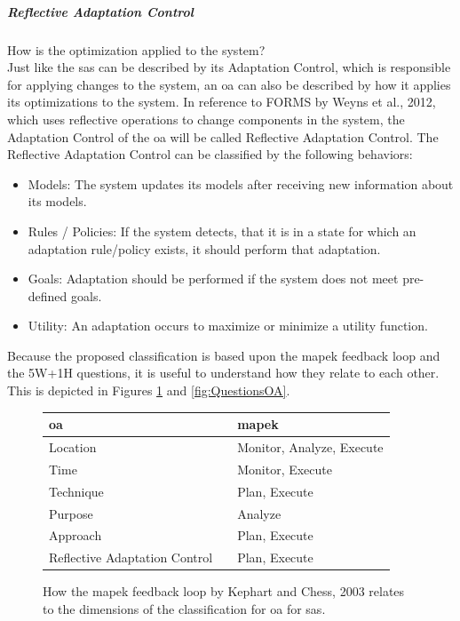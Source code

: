 \subparagraph*{Reflective Adaptation Control}
How is the optimization applied to the system? \\
Just like the \acrshort{sas} can be described by its Adaptation Control,
which is responsible for applying changes to the system,
an \acrshort{oa} can also be described by how it applies its optimizations to the system.
In reference to FORMS by Weyns et al., 2012\cite*{FORMS}, which uses reflective operations to change
components in the system, the Adaptation Control of the \acrshort{oa} will be called Reflective Adaptation Control.
The Reflective Adaptation Control can be classified by the following behaviors:
\begin{itemize}[nosep]
    \item Models: The system updates its models after receiving new information about its models.
    \item Rules / Policies: If the system detects, that it is in a state for which an adaptation rule/policy exists,
    it should perform that adaptation.
    \item Goals: Adaptation should be performed if the system does not meet pre-defined goals.
    \item Utility: An adaptation occurs to maximize or minimize a utility function.
\end{itemize}

\noindent Because the proposed classification is based upon the \acrshort{mapek} feedback loop and the 5W+1H questions,
it is useful to understand how they relate to each other.
This is depicted in Figures \ref{fig:MapeOA} and \ref{fig:QuestionsOA}.

\begin{figure}[h]
    \centering
    \begin{tabular}{|lcl|}
        \hline
        \acrlong{oa} & & \acrshort{mapek} \\
        \hline
        Location & & Monitor, Analyze, Execute \\
        \hline
        Time & & Monitor, Execute \\
        \hline
        Technique & & Plan, Execute \\
        \hline
        Purpose & & Analyze \\
        \hline
        Approach & & Plan, Execute \\
        \hline
        Reflective Adaptation Control & & Plan, Execute \\
        \hline
    \end{tabular}
    \caption{How the \acrshort{mapek} feedback loop by Kephart and Chess, 2003\cite*{VisionOfAutonomicComputing}
    relates to the dimensions of the classification for \acrshort{oa} for \acrshort{sas}.}
    \label{fig:MapeOA}
\end{figure}


